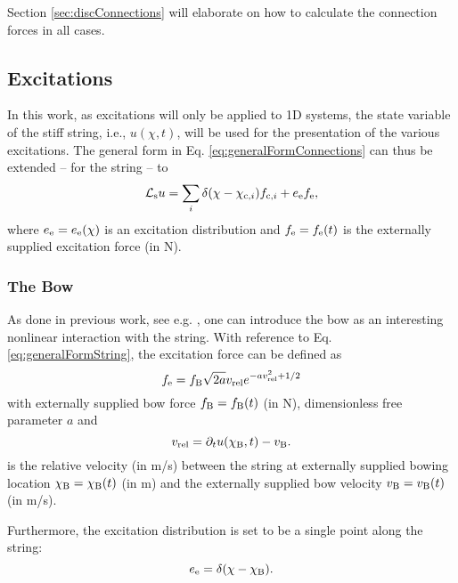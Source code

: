 \documentclass{article}
\begin{document}
Section \ref{sec:discConnections} will elaborate on how to calculate the connection forces in all cases.

\subsection{Excitations}
In this work, as excitations will only be applied to 1D systems, the state variable of the stiff string, i.e., $u(\chi, t)$, will be used for the presentation of the various excitations. The general form in Eq. \eqref{eq:generalFormConnections}
can thus be extended -- for the string -- to 
\begin{equation}\label{eq:generalFormString}
    \mathcal{L}_{\text{s}} u = \sum_i \delta(\chi - \chi_{\text{c}, i})f_{\text{c}, i} + e_{\text{e}} f_{\text{e}},
\end{equation}
where $e_{\text{e}} = e_{\text{e}}(\chi)$ is an excitation distribution and $f_{\text{e}} = f_{\text{e}}(t)$ is the externally supplied excitation force (in N).

\subsubsection{The Bow}
As done in previous work, see e.g. \cite{Willemsen2019}, one can introduce the bow as an interesting nonlinear interaction with the string. With reference to Eq. \eqref{eq:generalFormString}, the excitation force can be defined as \cite{theBible}
\begin{equation}
    f_\text{e} = f_{\text{B}}\sqrt{2a}v_\text{rel} e^{-av_\text{rel}^2+1/2} 
\end{equation}
with externally supplied bow force $f_{\text{B}} = f_{\text{B}}(t)$ (in N), dimensionless free parameter $a$ and 
\begin{equation}
    v_\text{rel} = \partial_t u(\chi_{\text{B}}, t) - v_{\text{B}}.
\end{equation}
is the relative velocity (in m/s) between the string at externally supplied bowing location $\chi_{\text{B}} = \chi_{\text{B}}(t)$ (in m) and the externally supplied bow velocity $v_{\text{B}} = v_{\text{B}}(t)$ (in m/s).

Furthermore, the excitation distribution is set to be a single point along the string:
\begin{equation}
    e_\text{e} = \delta(\chi - \chi_{\text{B}}).
\end{equation}
\end{document}
